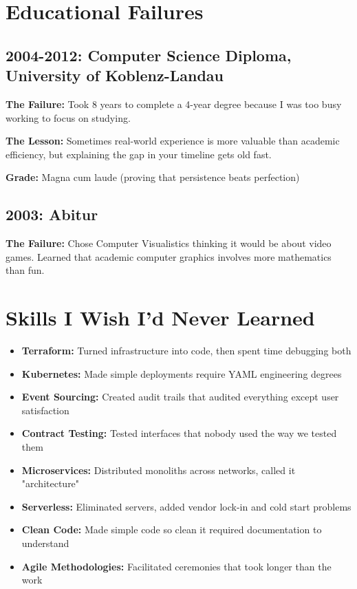\documentclass[10pt,a4paper]{article}
\begin{document}
\section*{Educational Failures}

\subsection*{2004-2012: Computer Science Diploma, University of Koblenz-Landau}
\textbf{The Failure:} Took 8 years to complete a 4-year degree because I was too busy working to focus on studying.

\textbf{The Lesson:} Sometimes real-world experience is more valuable than academic efficiency, but explaining the gap in your timeline gets old fast.

\textbf{Grade:} Magna cum laude (proving that persistence beats perfection)

\subsection*{2003: Abitur}
\textbf{The Failure:} Chose Computer Visualistics thinking it would be about video games. Learned that academic computer graphics involves more mathematics than fun.

\section*{Skills I Wish I'd Never Learned}

\begin{multicols}{2}
\begin{itemize}[leftmargin=1em,topsep=0pt,itemsep=0pt]
\item \textbf{Terraform:} Turned infrastructure into code, then spent time debugging both
\item \textbf{Kubernetes:} Made simple deployments require YAML engineering degrees
\item \textbf{Event Sourcing:} Created audit trails that audited everything except user satisfaction
\item \textbf{Contract Testing:} Tested interfaces that nobody used the way we tested them
\item \textbf{Microservices:} Distributed monoliths across networks, called it "architecture"
\item \textbf{Serverless:} Eliminated servers, added vendor lock-in and cold start problems
\item \textbf{Clean Code:} Made simple code so clean it required documentation to understand
\item \textbf{Agile Methodologies:} Facilitated ceremonies that took longer than the work
\end{itemize}
\end{multicols}
\end{document}
